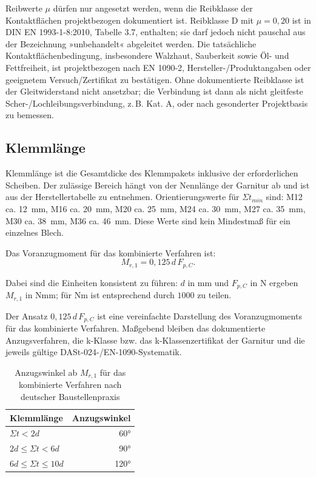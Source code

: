 \documentclass[10pt,a4paper]{article}
\begin{document}
\begin{hinweisbox}
Reibwerte $\mu$ dürfen nur angesetzt werden, wenn die Reibklasse der Kontaktflächen projektbezogen dokumentiert ist. Reibklasse D mit $\mu=0{,}20$ ist in DIN EN 1993-1-8:2010, Tabelle 3.7, enthalten; sie darf jedoch nicht pauschal aus der Bezeichnung »unbehandelt« abgeleitet werden. Die tatsächliche Kontaktflächenbedingung, insbesondere Walzhaut, Sauberkeit sowie Öl- und Fettfreiheit, ist projektbezogen nach EN 1090-2, Hersteller-/Produktangaben oder geeignetem Versuch/Zertifikat zu bestätigen. Ohne dokumentierte Reibklasse ist der Gleitwiderstand nicht ansetzbar; die Verbindung ist dann als nicht gleitfeste Scher-/Lochleibungsverbindung, z.\,B. Kat. A, oder nach gesonderter Projektbasis zu bemessen.
\end{hinweisbox}

\subsection{Klemmlänge}
Klemmlänge ist die Gesamtdicke des Klemmpakets inklusive der erforderlichen Scheiben. Der zulässige Bereich hängt von der Nennlänge der Garnitur ab und ist aus der Herstellertabelle zu entnehmen. Orientierungswerte für $\Sigma t_{min}$ sind: M12 ca. \SI{12}{mm}, M16 ca. \SI{20}{mm}, M20 ca. \SI{25}{mm}, M24 ca. \SI{30}{mm}, M27 ca. \SI{35}{mm}, M30 ca. \SI{38}{mm}, M36 ca. \SI{46}{mm}. Diese Werte sind kein Mindestmaß für ein einzelnes Blech.

Das Voranzugmoment für das kombinierte Verfahren ist:
\[
M_{r,1}=0{,}125\,d\,F_{p,C}.
\]

Dabei sind die Einheiten konsistent zu führen: $d$ in mm und $F_{p,C}$ in N ergeben $M_{r,1}$ in Nmm; für Nm ist entsprechend durch $1000$ zu teilen.

\begin{hinweisbox}
Der Ansatz $0{,}125\,d\,F_{p,C}$ ist eine vereinfachte Darstellung des Voranzugmoments für das kombinierte Verfahren. Maßgebend bleiben das dokumentierte Anzugsverfahren, die k-Klasse bzw. das k-Klassenzertifikat der Garnitur und die jeweils gültige DASt-024-/EN-1090-Systematik.
\end{hinweisbox}


\begin{table}[H]
\centering
\caption{Anzugswinkel ab $M_{r,1}$ für das kombinierte Verfahren nach deutscher Baustellenpraxis}
\begin{tabular}{@{}lr@{}}
\toprule
\textbf{Klemmlänge} & \textbf{Anzugswinkel} \\
\midrule
$\Sigma t < 2d$ & \ang{60} \\
$2d \leq \Sigma t < 6d$ & \ang{90} \\
$6d \leq \Sigma t \leq 10d$ & \ang{120} \\
\bottomrule
\end{tabular}
\end{table}
\end{document}
